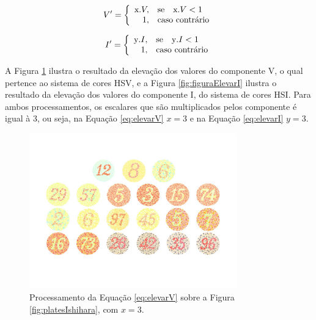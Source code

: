 \documentclass[	12pt, Times, openright, twoside, a4paper, english, brazil]{abntex2}
\begin{document}
\begin{equation}
\label{eq:elevarV}
V'=\left\{
\begin{array}{rl}
       $x$ . V,&\mbox{se}\quad $x$ . V < 1 \\
       1,&\mbox{caso contrário}
\end{array}\right.
\end{equation}

\begin{equation}
\label{eq:elevarI}
I'=\left\{
\begin{array}{rl}
       $y$ . I,&\mbox{se}\quad $y$ . I < 1 \\
       1,&\mbox{caso contrário}
\end{array}\right.
\end{equation}

A Figura \ref{fig:figuraElevarV} ilustra o resultado da elevação dos valores do componente V, o qual pertence ao sistema de cores HSV, e a Figura \ref{fig:figuraElevarI} ilustra o resultado da elevação dos valores do componente I, do sistema de cores HSI. Para ambos processamentos, os escalares que são multiplicados pelos componente é igual à $3$, ou seja, na Equação \ref{eq:elevarV} $x=3$ e na Equação \ref{eq:elevarI} $y=3$.

\begin{figure}[!htb]
\centering \includegraphics[width=0.80\textwidth]{figuraElevarV.jpg}
\caption{Processamento da Equação \ref{eq:elevarV} sobre a Figura \ref{fig:platesIshihara}, com $x = 3$. \label{fig:figuraElevarV}}
\end{figure}
\end{document}
